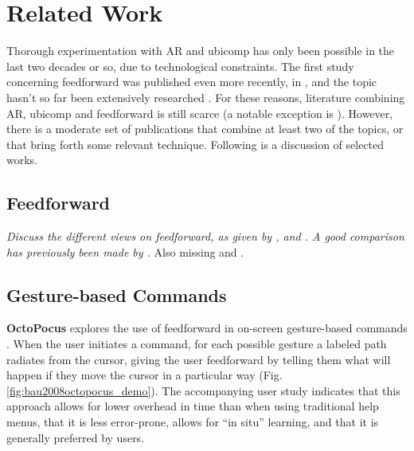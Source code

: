 \chapter{Related Work} \label{chap:relat}
Thorough experimentation with AR and ubicomp has only been possible in the last two decades or so, due to technological constraints. The first study concerning feedforward was published even more recently, in \citeyear{djajadiningrat2002but} \cite{djajadiningrat2002but}, and the topic hasn't so far been extensively researched \cite{vermeulen2013crossing}. For these reasons, literature combining AR, ubicomp and feedforward is still scarce (a notable exception is \cite{vermeulen2009bet}). However, there is a moderate set of publications that combine at least two of the topics, or that bring forth some relevant technique. Following is a discussion of selected works. 

\section{Feedforward} \label{sec:related_work:feedforward}
\textit{Discuss the different views on feedforward, as given by \citeauthor{djajadiningrat2002but} \cite{djajadiningrat2002but}, \citeauthor{wensveen2004interaction} \cite{wensveen2004interaction} and \citeauthor{vermeulen2013crossing} \cite{vermeulen2013crossing}. A good comparison has previously been made by \citeauthor{chueke2016perceptible} \cite{chueke2016perceptible}.} Also missing \cite{djajadiningrat2004tangible} and \cite{norman2013design}.

\section{Gesture-based Commands} \label{sec:related_work:gesture-based_commands}
\textbf{OctoPocus} explores the use of feedforward in on-screen gesture-based commands \cite{bau2008octopocus}. When the user initiates a command, for each possible gesture a labeled path radiates from the cursor, giving the user feedforward by telling them what will happen if they move the cursor in a particular way (Fig. \ref{fig:bau2008octopocus_demo}). The accompanying user study indicates that this approach allows for lower overhead in time than when using traditional help menus, that it is less error-prone, allows for ``in situ'' learning, and that it is generally preferred by users.

